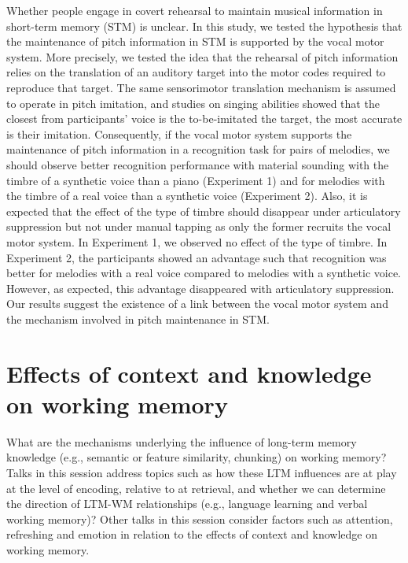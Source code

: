 \documentclass[12pt,]{book}
\begin{document}
Whether people engage in covert rehearsal to maintain musical information in short-term memory (STM) is unclear. In this study, we tested the hypothesis that the maintenance of pitch information in STM is supported by the vocal motor system. More precisely, we tested the idea that the rehearsal of pitch information relies on the translation of an auditory target into the motor codes required to reproduce that target. The same sensorimotor translation mechanism is assumed to operate in pitch imitation, and studies on singing abilities showed that the closest from participants' voice is the to-be-imitated the target, the most accurate is their imitation. Consequently, if the vocal motor system supports the maintenance of pitch information in a recognition task for pairs of melodies, we should observe better recognition performance with material sounding with the timbre of a synthetic voice than a piano (Experiment 1) and for melodies with the timbre of a real voice than a synthetic voice (Experiment 2). Also, it is expected that the effect of the type of timbre should disappear under articulatory suppression but not under manual tapping as only the former recruits the vocal motor system. In Experiment 1, we observed no effect of the type of timbre. In Experiment 2, the participants showed an advantage such that recognition was better for melodies with a real voice compared to melodies with a synthetic voice. However, as expected, this advantage disappeared with articulatory suppression. Our results suggest the existence of a link between the vocal motor system and the mechanism involved in pitch maintenance in STM.

\hypertarget{effects-of-context-and-knowledge-on-working-memory}{%
\chapter{Effects of context and knowledge on working memory}\label{effects-of-context-and-knowledge-on-working-memory}}

What are the mechanisms underlying the influence of long-term memory knowledge (e.g., semantic or feature similarity, chunking) on working memory? Talks in this session address topics such as how these LTM influences are at play at the level of encoding, relative to at retrieval, and whether we can determine the direction of LTM-WM relationships (e.g., language learning and verbal working memory)? Other talks in this session consider factors such as attention, refreshing and emotion in relation to the effects of context and knowledge on working memory.
\end{document}
